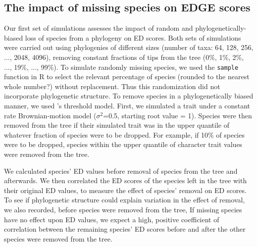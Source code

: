 \documentclass[12pt,english]{article}
\begin{document}
\subsection*{The impact of missing species on EDGE scores}
Our first set of simulations assesses the impact of random and
phylogenetically-biased loss of species from a phylogeny on ED scores.
Both sets of simulations were carried out
using phylogenies of different sizes (number of taxa: 64, 128, 256, ..., 2048,
4096), removing constant fractions of tips from the tree (0\%, 1\%, 2\%, ...,
19\%, ..., 99\%).
To simulate randomly missing species, we used the \texttt{sample}
function in R to select the relevant percentage of species (rounded to
the nearest whole number?) without replacement. 
Thus this randomization did not incorporate phylogenetic structure.
To remove species in a phylogenetically biased manner, we used
\textcite{Felsenstein2005}'s threshold model. First, we simulated a
trait under a constant rate Brownian-motion model ($\sigma^2$=0.5,
starting root value = 1).
Species were then removed from the tree if their simulated trait was
in the upper quantile of whatever fraction of species were to be
dropped. For example, if
10\% of species were to be dropped, species within the upper  quantile of
character trait values were removed from the tree.

We calculated species' ED values before removal of species from the
tree and afterwards. We then correlated the ED scores of the species
left in the tree with their original ED values, to measure the effect
of species' removal on ED scores. To see if phylogenetic structure
could explain variation in the effect of removal, we also recorded,
before species were removed from the tree,  
If missing species
have no effect upon ED values, we expect a high, positive coefficient of
correlation between the remaining species' ED scores before and after
the other species were removed from the tree.

\end{document}
